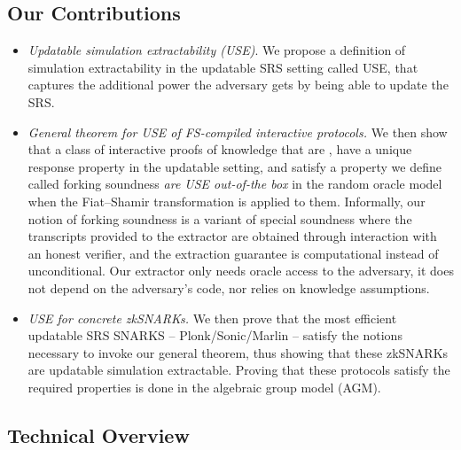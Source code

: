 \subsection{Our Contributions}
\begin{itemize}
\item 
\emph{Updatable simulation extractability (USE)}. 
We propose a definition of simulation extractability in the updatable SRS setting called USE, that captures the additional power the adversary gets by being able to update the SRS.%
    
\item 
\emph{General theorem for USE of FS-compiled interactive protocols.}
We then show that a class of interactive proofs of knowledge that are ,
have a unique response property in the updatable setting, and satisfy a property we define called forking soundness \emph{are USE out-of-the box} in the random oracle model when the Fiat--Shamir transformation is applied to them. 
Informally, our notion of forking soundness is a variant of special soundness where the transcripts provided to the extractor are
obtained through interaction with an honest verifier, and the extraction guarantee is computational instead of unconditional. 
Our extractor only needs oracle access to the adversary, it does not depend on the adversary’s code, nor relies on knowledge
assumptions.
    
\item
\emph{USE for concrete zkSNARKs.}
We then prove that the most efficient updatable SRS SNARKS -- Plonk/Sonic/Marlin -- satisfy the notions necessary to invoke our general theorem, thus showing that these zkSNARKs are updatable simulation extractable.
Proving that these protocols satisfy the required properties is done in the algebraic group model (AGM).
	
\end{itemize}



\subsection{Technical Overview}

